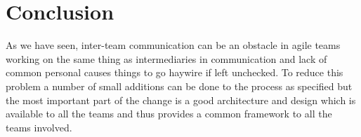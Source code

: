 \section{Conclusion}\label{sec:conclusion}
As we have seen, inter-team communication can be an obstacle in agile teams working on the same thing as intermediaries in communication and lack of common personal causes things to go haywire if left unchecked.
To reduce this problem a number of small additions can be done to the process as specified but the most important part of the change is a good architecture and design which is available to all the teams and thus provides a common framework to all the teams involved.
